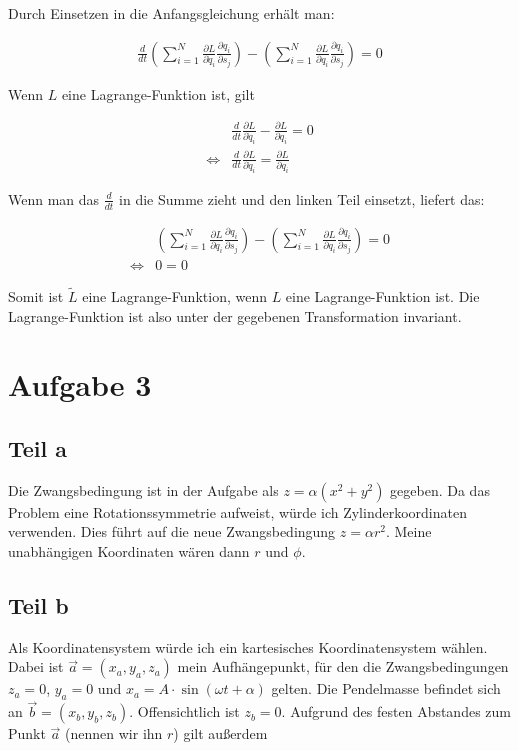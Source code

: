 \documentclass[a4paper,german,12pt,smallheadings]{scrartcl}
\begin{document}
Durch Einsetzen in die Anfangsgleichung erhält man:

\begin{align*}
\frac{d}{dt} \left(
  \sum_{i=1}^N \frac{\partial L}{\partial \dot{q}_i} \frac{\partial q_i}{\partial s_j}
\right) - \left(
  \sum_{i=1}^N \frac{\partial L}{\partial q_i} \frac{\partial q_i}{\partial s_j}
\right) = 0
\end{align*}

Wenn $L$ eine Lagrange-Funktion ist, gilt

\begin{align*}
  &\frac{d}{dt}\frac{\partial L}{\partial \dot{q}_i} - \frac{\partial L}{\partial q_i} = 0 \\
  \Leftrightarrow &\frac{d}{dt}\frac{\partial L}{\partial \dot{q}_i} = \frac{\partial L}{\partial q_i}
\end{align*}

Wenn man das $\frac{d}{dt}$ in die Summe zieht und den linken Teil einsetzt, liefert das:

\begin{align*}
&\left(
  \sum_{i=1}^N \frac{\partial L}{\partial q_i} \frac{\partial q_i}{\partial s_j}
\right) - \left(
  \sum_{i=1}^N \frac{\partial L}{\partial q_i} \frac{\partial q_i}{\partial s_j}
\right) = 0 \\
\Leftrightarrow &0 = 0
\end{align*}

Somit ist $\tilde{L}$ eine Lagrange-Funktion, wenn $L$ eine Lagrange-Funktion
ist. Die Lagrange-Funktion ist also unter der gegebenen Transformation
invariant.

\section*{Aufgabe 3}
\subsection*{Teil a}

Die Zwangsbedingung ist in der Aufgabe als $z = \alpha (x^2+y^2)$ gegeben. Da
das Problem eine Rotationssymmetrie aufweist, würde ich Zylinderkoordinaten
verwenden. Dies führt auf die neue Zwangsbedingung $z = \alpha r^2$. Meine
unabhängigen Koordinaten wären dann $r$ und $\phi$.

\subsection*{Teil b}
Als Koordinatensystem würde ich ein kartesisches Koordinatensystem wählen.
Dabei ist $\vec{a} = (x_a, y_a, z_a)$ mein Aufhängepunkt, für den die
Zwangsbedingungen $z_a = 0$, $y_a = 0$ und $x_a = A \cdot \sin (\omega t +
\alpha)$ gelten.
Die Pendelmasse befindet sich an $\vec{b} = (x_b, y_b, z_b)$. Offensichtlich
ist $z_b = 0$. Aufgrund des festen Abstandes zum Punkt $\vec{a}$ (nennen wir
ihn $r$) gilt außerdem
\end{document}
